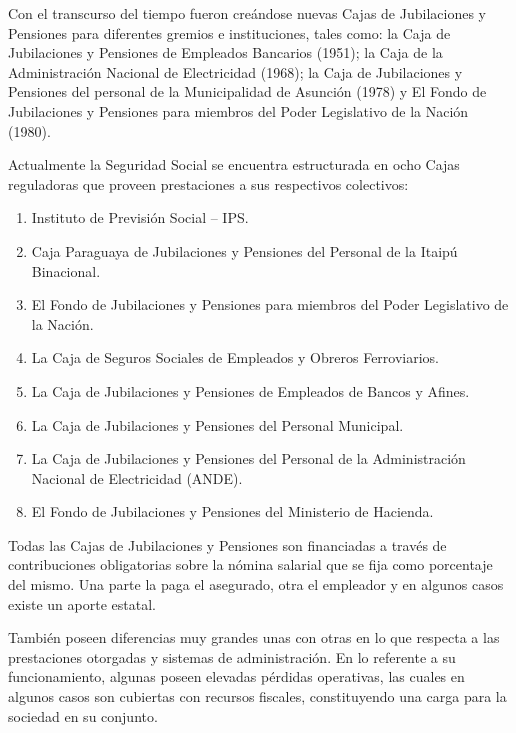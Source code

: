 Con el transcurso del tiempo fueron creándose nuevas Cajas de Jubilaciones y Pensiones para diferentes gremios e instituciones, tales como: la Caja de Jubilaciones y Pensiones de Empleados Bancarios (1951); la Caja de la Administración Nacional de Electricidad (1968); la Caja de Jubilaciones y Pensiones del personal de la Municipalidad de Asunción (1978) y El Fondo de Jubilaciones y Pensiones para miembros del Poder Legislativo de la Nación (1980).

Actualmente la Seguridad Social se encuentra estructurada en ocho Cajas reguladoras que proveen prestaciones a sus respectivos colectivos: 

\begin {enumerate}

\item Instituto de Previsión Social – IPS. 

\item Caja Paraguaya de Jubilaciones y Pensiones del Personal de la Itaipú Binacional.

\item El Fondo de Jubilaciones y Pensiones para miembros del Poder Legislativo de la Nación. 

\item La Caja de Seguros Sociales de Empleados y Obreros Ferroviarios. 

\item La Caja de Jubilaciones y Pensiones de Empleados de Bancos y Afines.

\item La Caja de Jubilaciones y Pensiones del Personal Municipal.

\item La Caja de Jubilaciones y Pensiones del Personal de la Administración Nacional de Electricidad (ANDE). 

\item El Fondo de Jubilaciones y Pensiones del Ministerio de Hacienda. 

\end{enumerate}

Todas las Cajas de Jubilaciones y Pensiones son financiadas a través de contribuciones obligatorias sobre la nómina salarial que se fija como porcentaje del mismo. Una parte la paga el asegurado, otra el empleador y en algunos casos existe un aporte estatal.

También poseen diferencias muy grandes unas con otras en lo que respecta a las prestaciones otorgadas y sistemas de administración. En lo referente a su funcionamiento, algunas poseen elevadas pérdidas operativas, las cuales en algunos casos son cubiertas con recursos fiscales, constituyendo una carga para la sociedad en su conjunto.

